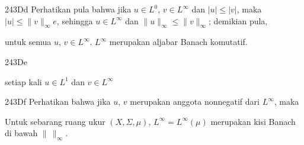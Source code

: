 \spheader 243Dd Perhatikan pula bahwa jika $u\in L^0$,
$v\in L^{\infty}$ dan $|u|\le|v|$, maka
$|u|\le\|v\|_{\infty}e$, sehingga $u\in L^{\infty}$ dan
$\|u\|_{\infty}\le\|v\|_{\infty}$; demikian pula,
     
     
\noindent untuk semua $u$, $v\in L^{\infty}$. 
$L^{\infty}$ merupakan aljabar Banach komutatif.
     
\spheader 243De 

     
\noindent setiap kali $u\in L^1$ dan $v\in L^{\infty}$
     
\spheader 243Df
Perhatikan bahwa jika $u$, $v$ merupakan anggota nonnegatif dari
$L^{\infty}$, maka
     
     
     
 Untuk sebarang ruang ukur $(X,\Sigma,\mu)$,
$L^{\infty}=L^{\infty}(\mu)$ merupakan kisi Banach di bawah
$\|\,\|_{\infty}$.
     
